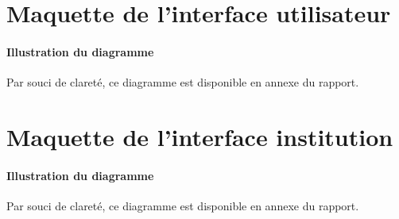 \documentclass[]{report}
\begin{document}
\newpage




\section{Maquette de l'interface utilisateur}



\vspace*{\fill}

\paragraph{Illustration du diagramme} Par souci de clareté, ce diagramme est disponible en annexe du rapport.

\newpage


\section{Maquette de l'interface institution}



\vspace*{\fill}

\paragraph{Illustration du diagramme} Par souci de clareté, ce diagramme est disponible en annexe du rapport.
\end{document}

